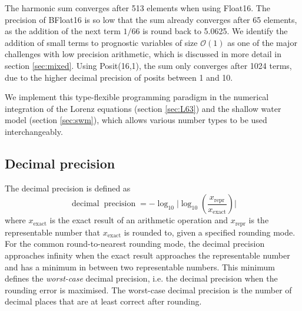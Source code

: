 \documentclass[draft]{agujournal2019}
\newcommand{\op}{\operatorname}
\begin{document}
The harmonic sum converges after 513 elements when using Float16. The precision of BFloat16 is so low that the sum already converges after 65 elements, as the addition of the next term $1/66$ is round back to 5.0625. We identify the addition of small terms to prognostic variables of size $\mathcal{O}(1)$ as one of the major challenges with low precision arithmetic, which is discussed in more detail in section \ref{sec:mixed}. Using Posit(16,1), the sum only converges after 1024 terms, due to the higher decimal precision of posits between 1 and 10.

We implement this type-flexible programming paradigm in the numerical integration of the Lorenz equations (section \ref{sec:L63}) and the shallow water model (section \ref{sec:swm}), which allows various number types to be used interchangeably.

\subsection{Decimal precision}
\label{sec:decprec}

The decimal precision is defined as \cite{Gustafson2017,Gustafson2017b}
\begin{equation}
\op{decimal} \op{precision} = -\log_{10} \vert \log_{10}( \frac{x_\text{repr}}{x_\text{exact}} ) \vert
\end{equation}
where $x_\text{exact}$ is the exact result of an arithmetic operation and $x_\text{repr}$ is the representable number that $x_\text{exact}$ is rounded to, given a specified rounding mode. For the common round-to-nearest rounding mode, the decimal precision approaches infinity when the exact result approaches the representable number and has a minimum in between two representable numbers. This minimum defines the \emph{worst-case} decimal precision, i.e. the decimal precision when the rounding error is maximised. The worst-case decimal precision is the number of decimal places that are at least correct after rounding. 
\end{document}

